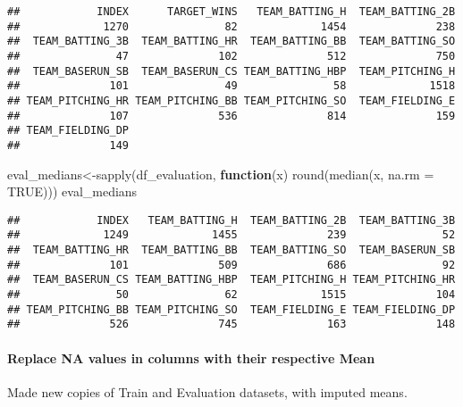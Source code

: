 \documentclass[
]{article}
\newenvironment{Shaded}{\begin{snugshade}}{\end{snugshade}}
\newcommand{\AttributeTok}[1]{\textcolor[rgb]{0.77,0.63,0.00}{#1}}
\newcommand{\ConstantTok}[1]{\textcolor[rgb]{0.00,0.00,0.00}{#1}}
\newcommand{\ControlFlowTok}[1]{\textcolor[rgb]{0.13,0.29,0.53}{\textbf{#1}}}
\newcommand{\FunctionTok}[1]{\textcolor[rgb]{0.00,0.00,0.00}{#1}}
\newcommand{\NormalTok}[1]{#1}
\newcommand{\OtherTok}[1]{\textcolor[rgb]{0.56,0.35,0.01}{#1}}
\begin{document}
\begin{verbatim}
##            INDEX      TARGET_WINS   TEAM_BATTING_H  TEAM_BATTING_2B 
##             1270               82             1454              238 
##  TEAM_BATTING_3B  TEAM_BATTING_HR  TEAM_BATTING_BB  TEAM_BATTING_SO 
##               47              102              512              750 
##  TEAM_BASERUN_SB  TEAM_BASERUN_CS TEAM_BATTING_HBP  TEAM_PITCHING_H 
##              101               49               58             1518 
## TEAM_PITCHING_HR TEAM_PITCHING_BB TEAM_PITCHING_SO  TEAM_FIELDING_E 
##              107              536              814              159 
## TEAM_FIELDING_DP 
##              149
\end{verbatim}

\begin{Shaded}
\begin{Highlighting}[]
\NormalTok{eval\_medians}\OtherTok{\textless{}{-}}\FunctionTok{sapply}\NormalTok{(df\_evaluation, }\ControlFlowTok{function}\NormalTok{(x) }\FunctionTok{round}\NormalTok{(}\FunctionTok{median}\NormalTok{(x, }\AttributeTok{na.rm =} \ConstantTok{TRUE}\NormalTok{)))}
\NormalTok{eval\_medians}
\end{Highlighting}
\end{Shaded}

\begin{verbatim}
##            INDEX   TEAM_BATTING_H  TEAM_BATTING_2B  TEAM_BATTING_3B 
##             1249             1455              239               52 
##  TEAM_BATTING_HR  TEAM_BATTING_BB  TEAM_BATTING_SO  TEAM_BASERUN_SB 
##              101              509              686               92 
##  TEAM_BASERUN_CS TEAM_BATTING_HBP  TEAM_PITCHING_H TEAM_PITCHING_HR 
##               50               62             1515              104 
## TEAM_PITCHING_BB TEAM_PITCHING_SO  TEAM_FIELDING_E TEAM_FIELDING_DP 
##              526              745              163              148
\end{verbatim}

\hypertarget{replace-na-values-in-columns-with-their-respective-mean}{%
\paragraph{\texorpdfstring{\textbf{Replace NA values in columns with
their respective
Mean}}{Replace NA values in columns with their respective Mean}}\label{replace-na-values-in-columns-with-their-respective-mean}}

Made new copies of Train and Evaluation datasets, with imputed means.
\end{document}
